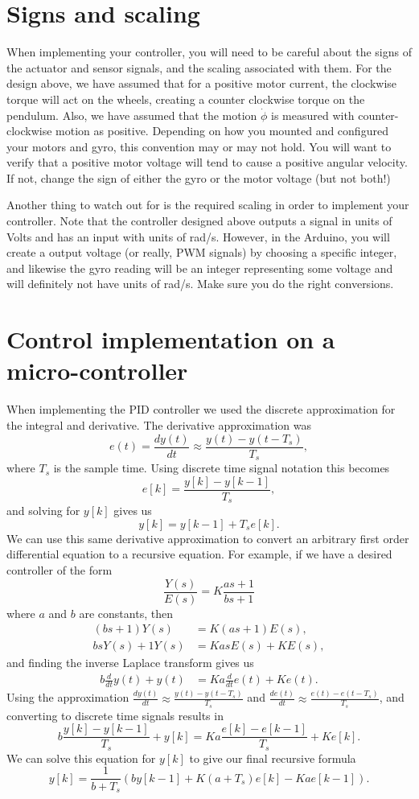 \section{Signs and scaling}

When implementing your controller, you will need to be careful about the signs of the actuator and sensor signals, and the scaling associated with them. For the design above, we have assumed that for a positive motor current, the clockwise torque will act on the wheels, creating a counter clockwise torque on the pendulum. Also, we have assumed that the motion $\dot{\phi}$ is measured with counter-clockwise motion as positive. Depending on how you mounted and configured your motors and gyro, this convention may or may not hold. You will want to verify that a positive motor voltage will tend to cause a positive angular velocity. If not, change the sign of either the gyro or the motor voltage (but not both!)

Another thing to watch out for is the required scaling in order to implement your controller. Note that the controller designed above outputs a signal in units of Volts and has an input with units of rad/s. However, in the Arduino, you will create a output voltage (or really, PWM signals) by choosing a specific integer, and likewise the gyro reading will be an integer representing some voltage and will definitely not have units of rad/s. Make sure you do the right conversions.

\section{Control implementation on a micro-controller}

When implementing the PID controller we used the discrete approximation for the integral and derivative. The derivative approximation was
\[
e(t) = \frac{dy(t)}{dt} \approx \frac{y(t) - y(t-T_{s})}{T_{s}}, 
\]
where $T_{s}$ is the sample time.  Using discrete time signal notation this becomes
\[
e[k]  = \frac{y[k] - y[k-1]}{T_{s}},
\]
and solving for $y[k]$ gives us
\[
y[k] = y[k-1] + T_{s}e[k].
\]
We can use this same derivative approximation to convert an arbitrary first order differential  equation to a recursive equation. For example, if we have a desired controller of the form
\[
\frac{Y(s)}{E(s)} = K\frac{as+1}{bs+1}
\]
where $a$ and $b$ are constants, then
\begin{align*}
(bs+1)Y(s) &= K(as+1)E(s),\\
bsY(s) + 1Y(s) &= KasE(s) + KE(s), 
\end{align*}
and finding the inverse Laplace transform gives us
\begin{align*}
b\frac{d}{dt}y(t) + y(t) & = Ka\frac{d}{dt}e(t) + K e(t).
\end{align*}
Using the approximation $\frac{dy(t)}{dt} \approx \frac{y(t) - y(t-T_{s})}{T_{s}}$ and $\frac{de(t)}{dt} \approx \frac{e(t) - e(t-T_{s})}{T_{s}}$, and converting to discrete time signals results in
\[
b\frac{y[k] - y[k-1]}{T_{s}} + y[k] = Ka\frac{e[k] - e[k-1]}{T_{s}} + Ke[k].
\]
We can solve this equation for $y[k]$ to give our final recursive formula 
\[
y[k] = \frac{1}{b+T_{s}}\left(b y[k-1]  + K(a+T_{s})e[k] - Kae[k-1]\right).
\]

